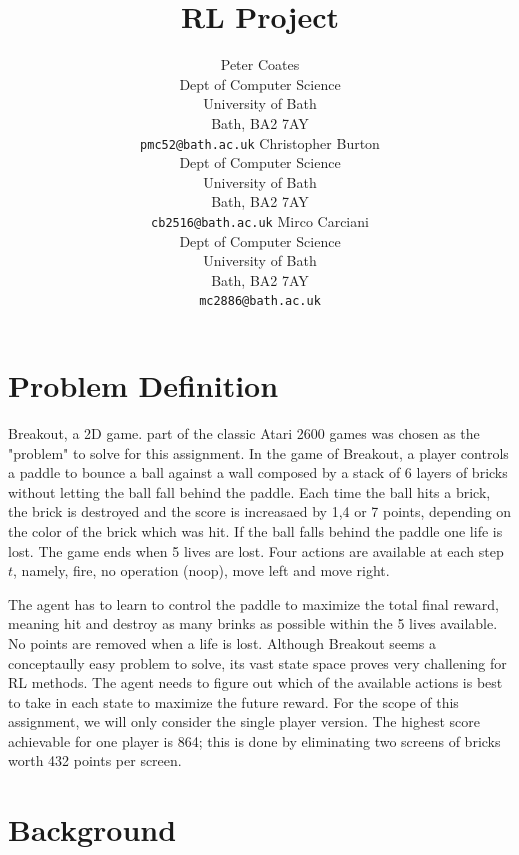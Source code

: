 \documentclass{article}
\title{RL Project}
\author{
  Peter Coates  \\
  Dept of Computer Science\\
  University of Bath\\
  Bath, BA2 7AY \\
  \texttt{pmc52@bath.ac.uk}
\And
  Christopher Burton\\
  Dept of Computer Science\\
  University of Bath \\
  Bath, BA2 7AY\\
  \texttt{cb2516@bath.ac.uk}
\And
  Mirco Carciani\\
  Dept of Computer Science\\
  University of Bath \\
  Bath, BA2 7AY\\
  \texttt{mc2886@bath.ac.uk}
}
\begin{document}
\maketitle

\section{Problem Definition}

Breakout, a 2D game. part of the classic Atari 2600 games was chosen as the "problem" to solve for this assignment.
In the game of Breakout, a player controls a paddle to bounce a ball against a wall composed by a stack of 6 layers of bricks without letting the ball fall behind the paddle. Each time the ball hits a brick, the brick is destroyed and the score is increasaed by 1,4 or 7 points, depending on the color of the brick which was hit. If the ball falls behind the paddle one life is lost. The game ends when 5 lives are lost.
Four actions are available at each step $t$, namely, fire, no operation (noop), move left and move right.

The agent has to learn to control the paddle to maximize the  total final reward, meaning hit and destroy as many brinks as possible within the 5 lives available. No points are removed when a life is lost. Although Breakout seems a conceptaully easy problem to solve, its vast state space proves very challening for RL methods. The agent needs to figure out which of the available actions is best to take in each state to maximize the future reward. For the scope of this assignment, we will only consider the single player version. The highest score achievable for one player is 864; this is done by eliminating two screens of bricks worth 432 points per screen.

\section{Background}

\end{document}
